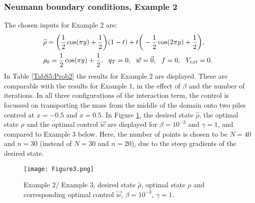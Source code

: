 \subsubsection{Neumann boundary conditions, Example 2} 
The chosen inputs for Example 2 are:
\begin{align*}
&\widehat \rho = \bigg(\frac{1}{2}\cos(\pi y) + \frac{1}{2}\bigg)(1-t) + t\bigg(-\frac{1}{2}\cos(2 \pi y) + \frac{1}{2}\bigg),\\
&\rho_{0} = \frac{1}{2}\cos(\pi y) + \frac{1}{2},\ \
q_{T} = 0,\ \
\vec{w} = \vec{0},\ \
f =0,\ \
V_{ext} =0.
\end{align*}
In Table \ref{TabS5:Prob2} the results for Example 2 are displayed. These are comparable with the results for Example 1, in the effect of $\beta$ and the number of iterations. In all three configurations of the interaction term, the control is focussed on transporting the mass from the middle of the domain onto two piles centred at $x=-0.5$ and $x=0.5$. In Figure \ref{Ex22DN1}, the desired state $\widehat \rho$, the optimal state $\rho$ and the optimal control $\vec{w}$ are displayed for $\beta = 10^{-3}$ and $\gamma = 1$, and compared to Example 3 below. Here, the number of points is chosen to be $N=40$ and $n=30$ (instead of $N=30$ and $n=20$), due to the steep gradients of the desired state.
\begin{figure}[h]
	\texttt{[image: Figure3.png]}
	\caption{Example 2/ Example 3, desired state $\widehat \rho$, optimal state $\rho$ and corresponding optimal control $\vec{w}$, $\beta = 10^{-3}$, $\gamma = 1$.}
	\label{Ex22DN1}
\end{figure}



